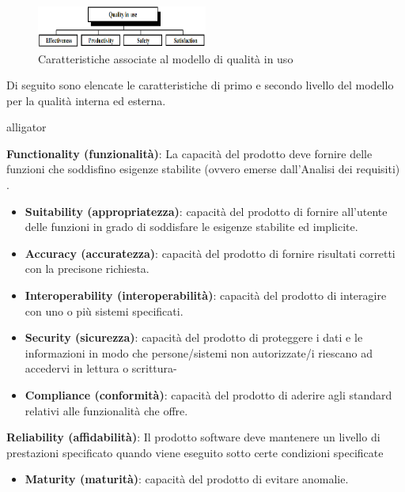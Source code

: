 \begin{figure}[h!]
	\centering
	\includegraphics[width=0.50\textwidth]{img/in_use.png}
	\caption{Caratteristiche associate al modello di qualità in uso}
	\label{fig:in_use}
\end{figure}

Di seguito sono elencate le caratteristiche di primo e secondo livello del modello per la qualità interna ed esterna.
\begin{labeling}{alligator}
	\item \textbf{Functionality (funzionalità)}: La capacità del prodotto deve fornire delle funzioni che soddisfino esigenze stabilite (ovvero emerse dall'Analisi dei requisiti) \marginpar{\textcolor{red}{mettere ref a doc}}.
	\begin{itemize}
		\item \textbf{Suitability (appropriatezza)}: capacità del prodotto di fornire all'utente delle funzioni in grado di soddisfare le esigenze stabilite ed implicite. 
		
		\item \textbf{Accuracy (accuratezza)}: capacità del prodotto di fornire risultati corretti con la precisone richiesta. 
		
		\item \textbf{Interoperability (interoperabilità)}: capacità del prodotto di interagire con uno o più sistemi specificati. 
		
		\item \textbf{Security (sicurezza)}: capacità del prodotto di proteggere i dati e le informazioni in modo che persone/sistemi non autorizzate/i riescano ad accedervi in lettura o scrittura-
		
		\item \textbf{Compliance (conformità)}: capacità del prodotto di aderire agli standard relativi alle funzionalità che offre.
	\end{itemize}
	\item \textbf{Reliability (affidabilità)}: Il prodotto software deve mantenere un livello di prestazioni specificato quando viene eseguito sotto certe condizioni specificate
	\begin{itemize}
		\item \textbf{Maturity (maturità)}: capacità del prodotto di evitare anomalie.
		

\end{itemize}
\end{labeling}
